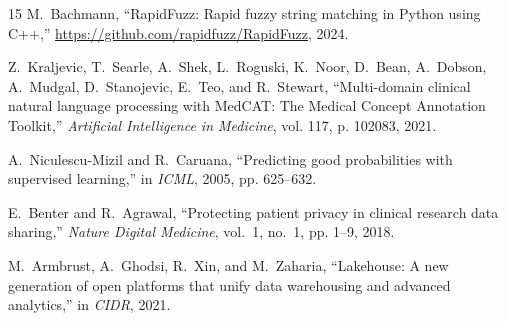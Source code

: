 \documentclass[10pt,journal,compsoc]{IEEEtran}
\begin{document}
\begin{thebibliography}{15}
M.~Bachmann, ``RapidFuzz: Rapid fuzzy string matching in Python using C++,'' \url{https://github.com/rapidfuzz/RapidFuzz}, 2024.

Z.~Kraljevic, T.~Searle, A.~Shek, L.~Roguski, K.~Noor, D.~Bean, A.~Dobson, A.~Mudgal, D.~Stanojevic, E.~Teo, and R.~Stewart, ``Multi-domain clinical natural language processing with MedCAT: The Medical Concept Annotation Toolkit,'' \emph{Artificial Intelligence in Medicine}, vol. 117, p. 102083, 2021.

A.~Niculescu-Mizil and R.~Caruana, ``Predicting good probabilities with supervised learning,'' in \emph{ICML}, 2005, pp. 625--632.

E.~Benter and R.~Agrawal, ``Protecting patient privacy in clinical research data sharing,'' \emph{Nature Digital Medicine}, vol.~1, no.~1, pp. 1--9, 2018.

M.~Armbrust, A.~Ghodsi, R.~Xin, and M.~Zaharia, ``Lakehouse: A new generation of open platforms that unify data warehousing and advanced analytics,'' in \emph{CIDR}, 2021.
\end{thebibliography}
\end{document}
